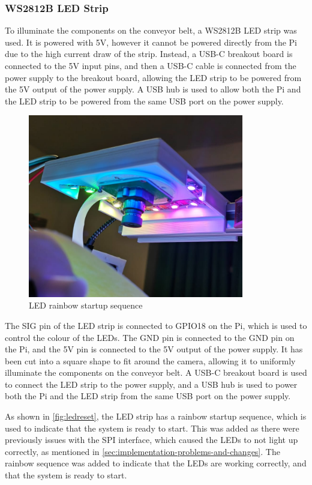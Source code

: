 \subsubsection{WS2812B LED Strip}
\label{sec:ws2812b-led-strip}
To illuminate the components on the conveyor belt, a WS2812B LED strip was used. It is powered with 5V, however it cannot be powered directly from the Pi due to the high current draw of the strip. Instead, a USB-C breakout board is connected to the 5V input pins, and then a USB-C cable is connected from the power supply to the breakout board, allowing the LED strip to be powered from the 5V output of the power supply. A USB hub is used to allow both the Pi and the LED strip to be powered from the same USB port on the power supply.

\begin{figure}[H]
  \hfill
  \begin{minipage}[t]{\textwidth}
    \centering
    \includegraphics[height=8cm]{imgs/real/ws2812.jpeg}
    \caption{LED rainbow startup sequence}
    \label{fig:ledreset}
  \end{minipage}
\end{figure}

The SIG pin of the LED strip is connected to GPIO18 on the Pi, which is used to control the colour of the LEDs. The GND pin is connected to the GND pin on the Pi, and the 5V pin is connected to the 5V output of the power supply. It has been cut into a square shape to fit around the camera, allowing it to uniformly illuminate the components on the conveyor belt. A USB-C breakout board is used to connect the LED strip to the power supply, and a USB hub is used to power both the Pi and the LED strip from the same USB port on the power supply.

As shown in \autoref{fig:ledreset}, the LED strip has a rainbow startup sequence, which is used to indicate that the system is ready to start. This was added as there were previously issues with the SPI interface, which caused the LEDs to not light up correctly, as mentioned in \autoref{sec:implementation-problems-and-changes}. The rainbow sequence was added to indicate that the LEDs are working correctly, and that the system is ready to start.
